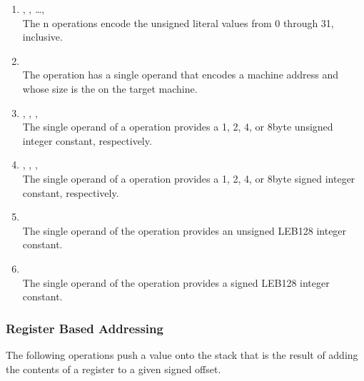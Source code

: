 \begin{enumerate}[1]
\item {}, , \dots,  \\
The n operations encode the unsigned literal values
from 0 through 31, inclusive.

\item {} \\
The  operation has a single operand that encodes
a machine address and whose size is the 
on the target machine.

\item {}, , ,  \\
The single operand of a  operation provides a 1,
2, 4, or 8\dash byte unsigned integer constant, respectively.

\item {} , , ,  \\
The single operand of a  operation provides a 1,
2, 4, or 8\dash byte signed integer constant, respectively.

\item {} \\
The single operand of the  operation provides
an unsigned LEB128 integer constant.

\item {} \\
The single operand of the  operation provides
a signed LEB128 integer constant.

\end{enumerate}


\subsubsection{Register Based Addressing}
\label{chap:registerbasedaddressing}
The following operations push a value onto the stack that is
the result of adding the contents of a register to a given
signed offset.

